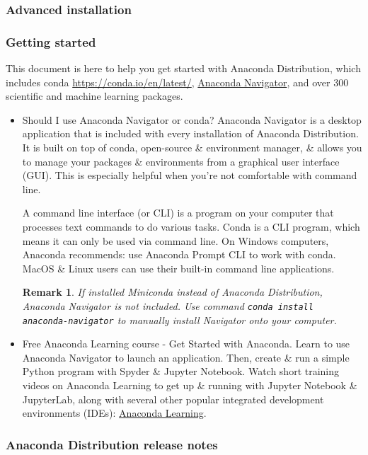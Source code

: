 \documentclass{article}
\newtheorem{remark}{Remark}
\begin{document}
\subsubsection{Advanced installation}

\subsubsection{Getting started}
This document is here to help you get started with Anaconda Distribution, which includes conda \url{https://conda.io/en/latest/}, \href{https://docs.anaconda.com/navigator/}{Anaconda Navigator}, and over 300 scientific and machine learning packages.
\begin{itemize}
	\item {\sf Should I use Anaconda Navigator or conda?} Anaconda Navigator is a desktop application that is included with every installation of Anaconda Distribution. It is built on top of conda, open-source \& environment manager, \& allows you to manage your packages \& environments from a graphical user interface (GUI). This is especially helpful when you're not comfortable with command line.
	
	A command line interface (or CLI) is a program on your computer that processes text commands to do various tasks. Conda is a CLI program, which means it can only be used via command line. On Windows computers, Anaconda recommends: use Anaconda Prompt CLI to work with conda. MacOS \& Linux users can use their built-in command line applications.
	\begin{remark}
		If installed Miniconda instead of Anaconda Distribution, Anaconda Navigator is not included. Use command {\tt conda install anaconda-navigator} to manually install Navigator onto your computer.
	\end{remark}
	\item {\sf Free Anaconda Learning course - Get Started with Anaconda.} Learn to use Anaconda Navigator to launch an application. Then, create \& run a simple Python program with Spyder \& Jupyter Notebook. Watch short training videos on Anaconda Learning to get up \& running with Jupyter Notebook \& JupyterLab, along with several other popular integrated development environments (IDEs): \href{https://learning.anaconda.cloud/get-started-with-anaconda?utm_campaign=learning&utm_medium=documentation&utm_source=anacondadocs&utm_content=getstartedbutton}{Anaconda Learning}.
\end{itemize}

\subsubsection{Anaconda Distribution release notes}
\end{document}
